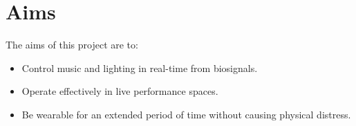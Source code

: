\section{Aims}
The aims of this project are to:

\begin{itemize}
        \item Control music and lighting in real-time from biosignals.
        \item Operate effectively in live performance spaces.
        \item Be wearable for an extended period of time without causing physical distress.
\end{itemize}
